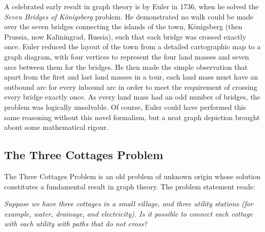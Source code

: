 \documentclass[11pt]{amsart}
\begin{document}
A celebrated early result in graph theory is by Euler in 1736, when he solved the \emph{Seven Bridges of K\"onigsberg} problem. He demonstrated no walk could be made over the seven bridges connecting the islands of the town, K\"onigsberg (then Prussia, now Kaliningrad, Russia), such that each bridge was crossed exactly once. Euler reduced the layout of the town from a detailed cartographic map to a graph diagram, with four vertices to represent the four land masses and seven arcs between them for the bridges. He then made the simple observation that apart from the first and last land masses in a tour, each land mass must have an outbound arc for every inbound arc in order to meet the requirement of crossing every bridge exactly once. As every land mass had an odd number of bridges, the problem was logically unsolvable. Of course, Euler could have performed this same reasoning without this novel formalism, but a neat graph depiction brought about some mathematical rigour.

\subsection{The Three Cottages Problem}

The Three Cottages Problem is an old problem of unknown origin whose solution constitutes a fundamental result in graph theory. The problem statement reads:

\emph{Suppose we have three cottages in a small village, and three utility stations (for example, water, drainage, and electricity). Is it possible to connect each cottage with each utility with paths that do not cross?}
\end{document}
